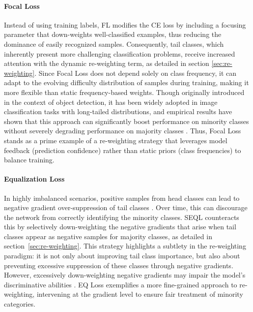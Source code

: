 \paragraph{Focal Loss}
Instead of using training labels, FL \cite{lin2018focallossdenseobject} modifies the CE loss by including a focusing parameter that down-weights well-classified examples, thus reducing the dominance of easily recognized samples. Consequently, tail classes, which inherently present more challenging classification problems, receive increased attention with the dynamic re-weighting term, as detailed in section \ref{sec:re-weighting}. Since Focal Loss does not depend solely on class frequency, it can adapt to the evolving difficulty distribution of samples during training, making it more flexible than static frequency-based weights. Though originally introduced in the context of object detection, it has been widely adopted in image classification tasks with long-tailed distributions, and empirical results have shown that this approach can significantly boost performance on minority classes without severely degrading performance on majority classes \cite{lin2018focallossdenseobject,zhang2023deep}. Thus, Focal Loss stands as a prime example of a re-weighting strategy that leverages model feedback (prediction confidence) rather than static priors (class frequencies) to balance training.

\paragraph{Equalization Loss}
In highly imbalanced scenarios, positive samples from head classes can lead to negative gradient over-suppression of tail classes \cite{zhang2023deep}. Over time, this can discourage the network from correctly identifying the minority classes. SEQL \cite{tan2020equalizationlosslongtailedobject} counteracts this by selectively down-weighting the negative gradients that arise when tail classes appear as negative samples for majority classes, as detailed in section~\ref{sec:re-weighting}. This strategy highlights a subtlety in the re-weighting paradigm: it is not only about improving tail class importance, but also about preventing excessive suppression of these classes through negative gradients. However, excessively down-weighting negative gradients may impair the model's discriminative abilities \cite{zhang2023deep}. EQ Loss exemplifies a more fine-grained approach to re-weighting, intervening at the gradient level to ensure fair treatment of minority categories. 

